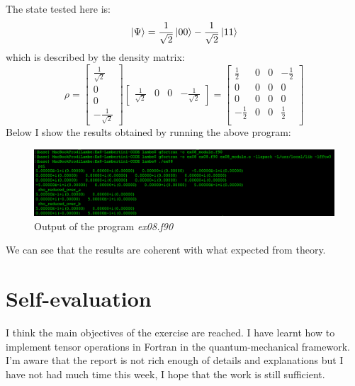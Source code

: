 \documentclass[prb,9pt,notitlepage]{revtex4-1}
\begin{document}
The state tested here is:
\begin{equation}
  \ket{\Psi} = \frac{1}{\sqrt{2}}\ket{00}-\frac{1}{\sqrt{2}}\ket{11} \nonumber
\end{equation}
which is described by the density matrix:
\begin{equation}
  \rho = \begin{bmatrix}
          \frac{1}{\sqrt{2}} \\
          0 \\
          0 \\
          -\frac{1}{\sqrt{2}}
        \end{bmatrix}
        \begin{bmatrix}
         \frac{1}{\sqrt{2}} &  0 & 0 & -\frac{1}{\sqrt{2}}
         \end{bmatrix} =
         \begin{bmatrix}
          \frac{1}{2} &  0 & 0 & -\frac{1}{2} \\
          0 &  0 & 0 & 0 \\
          0 &  0 & 0 & 0 \\
          -\frac{1}{2} &  0 & 0 & \frac{1}{2} \\
          \end{bmatrix}
\end{equation}
\newpage
Below I show the results obtained by running the above program:
\begin{figure}[H]
    \includegraphics[width=.85\textwidth]{output}\hfill
    \caption{Output of the program \textit{ex08.f90}}\label{fig:foobar}
\end{figure}
We can see that the results are coherent with what expected from theory.

\section{Self-evaluation}
I think the main objectives of the exercise are reached. I have learnt how to implement tensor operations in Fortran in the quantum-mechanical framework. I'm aware that the report is not rich enough of details and explanations but I have not had much time this week, I hope that the work is still sufficient.
\end{document}
